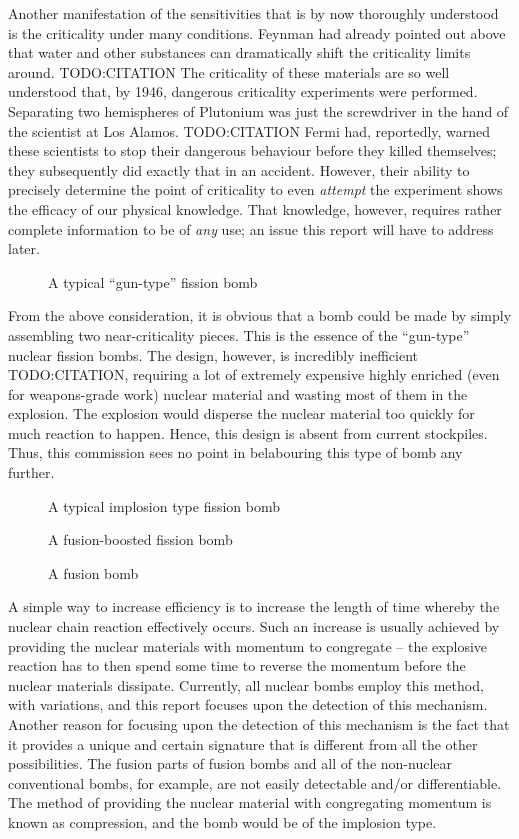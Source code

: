 \documentclass[twoside,titlepage,11pt,twocolumn,a4paper]{article}
\begin{document}
Another manifestation of the sensitivities that is by now thoroughly
understood is the criticality under many conditions. Feynman had
already pointed out above that water and other substances can
dramatically shift the criticality limits around. TODO:CITATION The
criticality of these materials are so well understood that, by 1946,
dangerous criticality experiments were performed. Separating two
hemispheres of Plutonium was just the screwdriver in the hand of the
scientist at Los Alamos. TODO:CITATION Fermi had, reportedly, warned
these scientists to stop their dangerous behaviour before they killed
themselves; they subsequently did exactly that in an
accident. However, their ability to precisely determine the point of
criticality to even \emph{attempt} the experiment shows the efficacy
of our physical knowledge. That knowledge, however, requires rather
complete information to be of \emph{any} use; an issue this report
will have to address later.

\begin{figure}
  \caption{A typical ``gun-type'' fission bomb}
\end{figure}

From the above consideration, it is obvious that a bomb could be made
by simply assembling two near-criticality pieces. This is the essence
of the ``gun-type'' nuclear fission bombs. The design, however, is
incredibly inefficient TODO:CITATION, requiring a lot of extremely
expensive highly enriched (even for weapons-grade work) nuclear
material and wasting most of them in the explosion. The explosion
would disperse the nuclear material too quickly for much reaction to
happen. Hence, this design is absent from current stockpiles. Thus,
this commission sees no point in belabouring this type of bomb any
further.

\begin{figure}
  \caption{A typical implosion type fission bomb}
\end{figure}
\begin{figure}
  \caption{A fusion-boosted fission bomb}
\end{figure}
\begin{figure}
  \caption{A fusion bomb}
\end{figure}

A simple way to increase efficiency is to increase the length of time
whereby the nuclear chain reaction effectively occurs. Such an
increase is usually achieved by providing the nuclear materials with
momentum to congregate -- the explosive reaction has to then spend
some time to reverse the momentum before the nuclear materials
dissipate. Currently, all nuclear bombs employ this method, with
variations, and this report focuses upon the detection of this
mechanism. Another reason for focusing upon the detection of this
mechanism is the fact that it provides a unique and certain signature
that is different from all the other possibilities. The fusion parts
of fusion bombs and all of the non-nuclear conventional bombs, for
example, are not easily detectable and/or differentiable. The method
of providing the nuclear material with congregating momentum is known
as compression, and the bomb would be of the implosion type.
\end{document}
